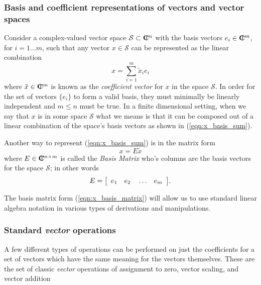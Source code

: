 \subsubsection{Basis and coefficient representations of vectors and vector spaces}

Consider a complex-valued vector space $\mathcal{S} {}\subset \CPLX^n$ with
the basis vectors $e_i\in\CPLX^m$, for $i=1\ldots{}m$, such that any vector
$x\in\mathcal{S}$ can be represented as the linear combination
%
\begin{equation}
x = \sum_{i=1}^{m} \tilde{x}_i e_i
\label{eqn:x_basis_sum}
\end{equation}
%
where $\tilde{x}\in\CPLX^m$ is known as the {}\textit{coefficient vector} for
$x$ in the space $\mathcal{S}$.  In order for the set of vectors $\{e_i\}$ to
form a valid basis, they must minimally be linearly independent and $m {}\le
n$ must be true.  In a finite dimensional setting, when we say that $x$ is in
some space $\mathcal{S}$ what we means is that it can be composed out of a
linear combination of the space's basis vectors as shown in
(\ref{eqn:x_basis_sum}).

Another way to represent (\ref{eqn:x_basis_sum}) is in the matrix form
%
\begin{equation}
x = E \tilde{x}
\label{eqn:x_basis_matrix}
\end{equation}
%
where $E\in\CPLX^{n\times{}m}$ is called the {}\textit{Basis Matrix} who's
columns are the basis vectors for the space $\mathcal{S}$; in other words
%
\begin{equation}
E = {\bmat{cccc} e_1 & e_2 & {}\ldots & e_m {}\emat}.
\end{equation}
%

The basis matrix form (\ref{eqn:x_basis_matrix}) will allow us to use standard
linear algebra notation in various types of derivations and manipulations.

\subsubsection{Standard {}\textit{vector} operations}

A few different types of operations can be performed on just the coefficients
for a set of vectors which have the same meaning for the vectors themselves.
These are the set of classic {}\textit{vector} operations of assignment to
zero, vector scaling, and vector addition

